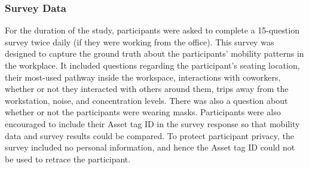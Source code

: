 \documentclass[acmtog]{acmart}
\begin{document}
\subsubsection{Survey Data}
For the duration of the study, participants were asked to complete a 15-question survey twice daily (if they were working from the office). This survey was designed to capture the ground truth about the participants' mobility patterns in the workplace. It included questions regarding the participant's seating location, their most-used pathway inside the workspace, interactions with coworkers, whether or not they interacted with others around them, trips away from the workstation, noise, and concentration levels. There was also a question about whether or not the participants were wearing masks. Participants were also encouraged to include their Asset tag ID in the survey response so that mobility data and survey results could be compared. To protect participant privacy, the survey included no personal information, and hence the Asset tag ID could not be used to retrace the participant.
\end{document}
